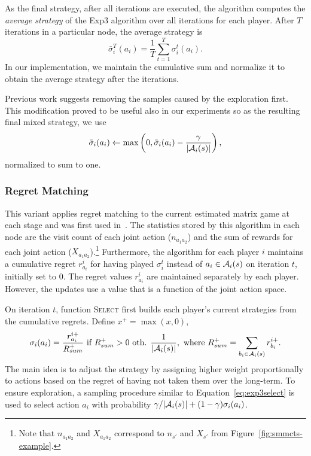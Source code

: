 As the final strategy, after all iterations are executed, the algorithm computes the \emph{average strategy} of the Exp3 algorithm over all iterations for each player.
 After $T$ iterations in a particular node, the average strategy is
\begin{equation}
\bar{\sigma}^T_i(a_i) = \frac{1}{T}\sum_{t=1}^T \sigma^t_i(a_i).
\end{equation}
In our implementation, we maintain the cumulative sum and normalize it to obtain the average strategy after the iterations.

Previous work \cite{Teytaud11Upper} suggests removing the samples caused by the exploration first.
This modification proved to be useful also in our experiments
so as the resulting final mixed strategy, we use
\begin{equation}
\bar{\sigma}_i(a_i) \leftarrow \max\left(0, \bar{\sigma}_i(a_i) - \frac{\gamma}{|\mathcal{A}_i(s)|}\right),
\end{equation}
normalized to sum to one.

\subsubsection{Regret Matching} \label{sec:rm}

This variant applies regret matching \cite{Hart00} to the current estimated matrix game at each stage and was first used in~\cite{Lanctot13Goofspiel}. The statistics stored by this algorithm in each node are the visit count of each joint action ($n_{a_1a_2}$) and the sum of rewards for each joint action ($X_{a_1a_2}$).\footnote{Note that $n_{a_1a_2}$ and $X_{a_1a_2}$ correspond to $n_{s'}$ and $X_{s'}$ from Figure~\ref{fig:smmcts-example}.}
Furthermore, the algorithm for each player $i$ maintains a cumulative regret $r^i_{a_i}$ for having played $\sigma_i^t$ instead of $a_i \in \mathcal{A}_i(s)$ on iteration $t$, initially set to 0. The regret values $r^i_{a_i}$ are maintained separately by each player. However, the updates use a value that is a function of the joint action space.

On iteration $t$, function \textsc{Select} first builds
each player's current strategies from the cumulative regrets. Define $x^+ = \max(x,0)$,
\begin{equation}
\label{eq:rm}
\sigma_i(a_i) = \frac{r^{i+}_{a_i}}{R^+_{sum}} \mbox{ if } R^+_{sum} > 0
\mbox{ oth. } \frac{1}{|\mathcal{A}_i(s)|}, \mbox{ where } R^+_{sum} = \sum_{b_i \in \mathcal{A}_i(s)}{r^{i+}_{b_i}}.
\end{equation}
The main idea is to adjust the strategy by assigning higher weight proportionally to actions based on the regret of having not taken them over the long-term.
To ensure exploration, a sampling procedure similar to Equation~\ref{eq:exp3select} is used to select action $a_i$ with probability
$\gamma/|\mathcal{A}_i(s)| + (1-\gamma) \sigma_i(a_i)$.

